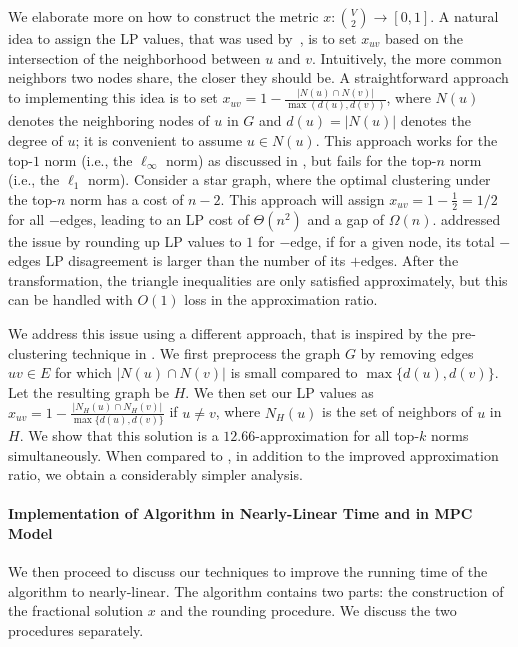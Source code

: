 \documentclass[11pt]{article}
\begin{document}
\begin{CJK*}{UTF8}{gbsn}
We elaborate more on how to construct the metric $x: {V \choose 2} \to [0, 1]$. 
A natural idea to assign the LP values, that was used by~\cite{davies2023one}, is to set $x_{uv}$ based on the intersection of the neighborhood between $u$ and $v$. Intuitively, the more common neighbors two nodes share, the closer they should be.  A straightforward approach to implementing this idea is to set $x_{uv} = 1 - \frac{|N(u) \cap N(v)|}{\max(d(u), d(v))}$, where $N(u)$ denotes the neighboring nodes of $u$ in $G$ and $d(u) = |N(u)|$ denotes the degree of $u$; it is convenient to assume $u \in N(u)$. This approach works for the top-$1$ norm (i.e., the $\ell_\infty$ norm) as discussed in \cite{davies2023fast}, but fails for the top-$n$ norm (i.e., the $\ell_1$ norm). Consider a star graph, where the optimal clustering under the top-$n$ norm has a cost of $n - 2$. This approach will assign $x_{uv} = 1 - \frac{1}{2} = 1/2$ for all $-$edges, leading to an LP cost of $\Theta(n^2)$ and a gap of $\Omega(n)$. \cite{davies2023one} addressed the issue by rounding up LP values to $1$ for $-$edge, if for a given node, its total $-$edges LP disagreement is larger than the number of its $+$edges. After the transformation, the triangle inequalities are only satisfied approximately, but this can be handled with $O(1)$ loss in the approximation ratio. 

We address this issue using a different approach, that is 
inspired by the pre-clustering technique in \cite{cohen2021correlation}. We first preprocess the graph $G$ by removing edges $uv \in E$ for which $|N(u) \cap N(v)|$ is small compared to $\max\{d(u), d(v)\}$. Let the resulting graph be $H$. We then set our LP values as $x_{uv} = 1 - \frac{|N_H(u) \cap N_H(v)|}{\max\{d(u), d(v)\}}$ if $u \neq v$, where $N_H(u)$ is the set of neighbors of $u$ in $H$.  We show that this solution is a $12.66$-approximation for all top-$k$ norms simultaneously. When compared to \cite{davies2023one}, in addition to the improved approximation ratio, we obtain a considerably simpler analysis.

\paragraph{Implementation of Algorithm in Nearly-Linear Time and in MPC Model} We then proceed to discuss our techniques to improve the running time of the algorithm to nearly-linear. The algorithm contains two parts: the construction of the fractional solution $x$ and the rounding procedure. We discuss the two procedures separately. 


\end{CJK*}
\end{document}
